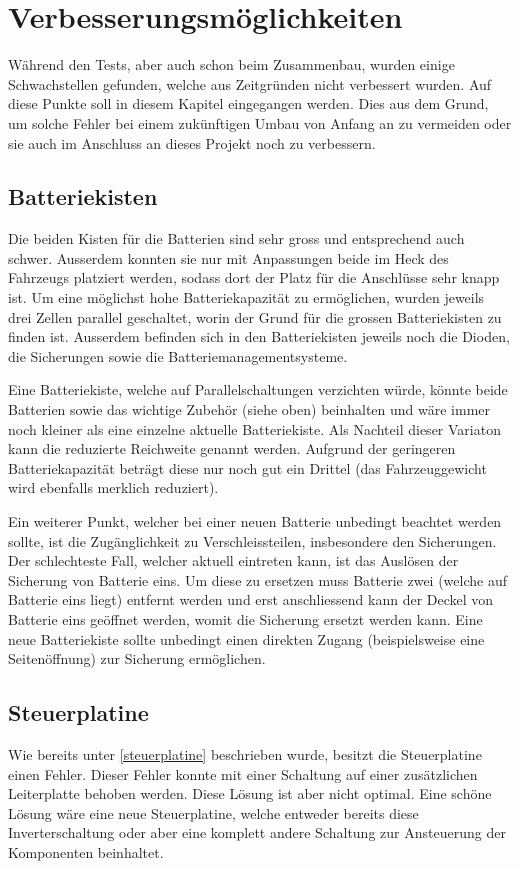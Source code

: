 \section{Verbesserungsmöglichkeiten}
\color{blue}
Während den Tests, aber auch schon beim Zusammenbau, wurden einige Schwachstellen gefunden, welche aus Zeitgründen nicht verbessert wurden. Auf diese Punkte soll in diesem Kapitel eingegangen werden. Dies aus dem Grund, um solche Fehler bei einem zukünftigen Umbau von Anfang an zu vermeiden oder sie auch im Anschluss an dieses Projekt noch zu verbessern. 

\subsection{Batteriekisten}
Die beiden Kisten für die Batterien sind sehr gross und entsprechend auch schwer. Ausserdem konnten sie nur mit Anpassungen beide im Heck des Fahrzeugs platziert werden, sodass dort der Platz für die Anschlüsse sehr knapp ist. Um eine möglichst hohe Batteriekapazität zu ermöglichen, wurden jeweils drei Zellen parallel geschaltet, worin der Grund für die grossen Batteriekisten zu finden ist. Ausserdem befinden sich in den Batteriekisten jeweils noch die Dioden, die Sicherungen sowie die Batteriemanagementsysteme.

Eine Batteriekiste, welche auf Parallelschaltungen verzichten würde, könnte beide Batterien sowie das wichtige Zubehör (siehe oben) beinhalten und wäre immer noch kleiner als eine einzelne aktuelle Batteriekiste. Als Nachteil dieser Variaton kann die reduzierte Reichweite genannt werden. Aufgrund der geringeren Batteriekapazität beträgt diese nur noch gut ein Drittel (das Fahrzeuggewicht wird ebenfalls merklich reduziert).

Ein weiterer Punkt, welcher bei einer neuen Batterie unbedingt beachtet werden sollte, ist die Zugänglichkeit zu Verschleissteilen, insbesondere den Sicherungen. Der schlechteste Fall, welcher aktuell eintreten kann, ist das Auslösen der Sicherung von Batterie eins. Um diese zu ersetzen muss Batterie zwei (welche auf Batterie eins liegt) entfernt werden und erst anschliessend kann der Deckel von Batterie eins geöffnet werden, womit die Sicherung ersetzt werden kann. Eine neue Batteriekiste sollte unbedingt einen direkten Zugang (beispielsweise eine Seitenöffnung) zur Sicherung ermöglichen.

\subsection{Steuerplatine}
Wie bereits unter \ref{steuerplatine} beschrieben wurde, besitzt die Steuerplatine einen Fehler. Dieser Fehler konnte mit einer Schaltung auf einer zusätzlichen Leiterplatte behoben werden. Diese Lösung ist aber nicht optimal. Eine schöne Lösung wäre eine neue Steuerplatine, welche entweder bereits diese Inverterschaltung oder aber eine komplett andere Schaltung zur Ansteuerung der Komponenten beinhaltet.

